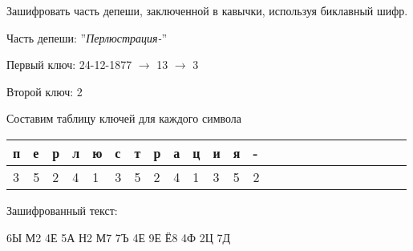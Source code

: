 \begin{problem}
  Зашифровать часть депеши, заключенной в кавычки, используя биклавный шифр.
  
  Часть депеши: ''\textit{Перлюстрация-}''
\end{problem}

\begin{solution}
  Первый ключ: 24-12-1877 $\rightarrow$ 13 $\rightarrow$ 3

  Второй ключ: 2

  Составим таблицу ключей для каждого символа

  \begin{table}[H]
    \centering
    \begin{tabular}{|l|l|l|l|l|l|l|l|l|l|l|l|l|l|l|l|l|l|l|l|l|l|l|l|}
      \hline
      п&е&р&л&ю&с&т&р&а&ц&и&я&- \\ \hline
      3&5&2&4&1&3&5&2&4&1&3&5&2 \\ \hline
    \end{tabular}
  \end{table}

  Зашифрованный текст:
  \begin{addmargin}[2cm]{1cm}
    6Ы М2 4Е 5А Н2 М7 7Ъ 4Е 9Е Ё8 4Ф 2Ц 7Д
  \end{addmargin}
\end{solution}
